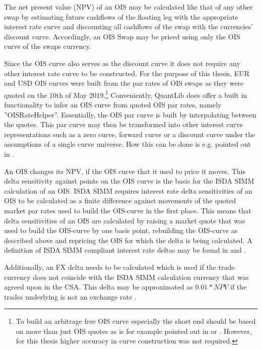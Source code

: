 \documentclass[../Thesis_AHoecherl.tex]{subfiles}
\begin{document}
    The net present value (\gls{NPV}) of an \gls{OIS} may be calculated like that of any other swap by estimating future cashflows of the floating leg with the appropriate interest rate curve and discounting all cashflows of the swap with the currencies' discount curve.
    Accordingly, an OIS Swap may be priced using only the OIS curve of the swaps currency.

    Since the OIS curve also serves as the discount curve it does not require any other interest rate curve to be constructed. 
    For the purpose of this thesis, EUR and USD OIS curves were built from the par rates of OIS swaps as they were quoted on the 10th of May 2019.\footnote{To build an arbitrage free OIS curve especially the short end should be based on more than just OIS quotes as is for example pointed out in \cite{ametrano2013everything} or \cite{brugger2018valuation}. However, for this thesis higher accuracy in curve construction was not required.}
    Conveniently, QuantLib does offer a built in functionality to infer an OIS curve from quoted OIS par rates, namely ''OISRateHelper''. Essentially, the OIS par curve is built by interpolating between the quotes.
    This par curve may then be transformed into other interest curve representations such as a zero curve, forward curve or a discount curve under the assumptions of a single curve universe. How this can be done is e.g. pointed out in \cite[Chapter 4]{hull2009options}.

    An OIS changes its \gls{NPV}, if the OIS curve that it used to price it moves.
    This delta sensitivity against points on the OIS curve is the basis for the \gls{ISDA SIMM} calculation of an OIS.
    \gls{ISDA SIMM} requires interest rate delta sensitivities of an OIS to be calculated as a finite difference against movements of the quoted market par rates used to build the OIS-curve in the first place. 
    This means that delta sensitivities of an OIS are calculated by raising a market quote that was used to build the OIS-curve by one basis point, rebuilding the OIS-curve as described above and repricing the OIS for which the delta is being calculated.
    A definition of \gls{ISDA SIMM} compliant interest rate deltas may be found in \cite[Point 22]{SIMM} and \cite[Section 2.2]{RiskDataStandard}.
    
    Additionally, an FX delta needs to be calculated which is used if the trade currency does not coincide with the \gls{ISDA SIMM} calculation currency that was agreed upon in the \gls{CSA}. This delta may be approximated as $0.01 * NPV$ if the trades underlying is not an exchange rate \cite[Section 2.7]{RiskDataStandard}.
\end{document}
